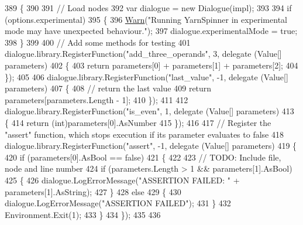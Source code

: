 \begin{DoxyCode}
389         \{
390 
391             \textcolor{comment}{// Load nodes}
392             var dialogue = \textcolor{keyword}{new} Dialogue(impl);
393 
394             \textcolor{keywordflow}{if} (options.experimental)
395             \{
396                 \hyperlink{a00197_a979bb6f049b6c5294f745a19e24ddd9d}{Warn}(\textcolor{stringliteral}{"Running YarnSpinner in experimental mode may have unexpected behaviour."});
397                 dialogue.experimentalMode = \textcolor{keyword}{true};
398             \}
399 
400             \textcolor{comment}{// Add some methods for testing}
401             dialogue.library.RegisterFunction(\textcolor{stringliteral}{"add\_three\_operands"}, 3, delegate (Value[] parameters)
402             \{
403                 \textcolor{keywordflow}{return} parameters[0] + parameters[1] + parameters[2];
404             \});
405 
406             dialogue.library.RegisterFunction(\textcolor{stringliteral}{"last\_value"}, -1, delegate (Value[] parameters)
407             \{
408                 \textcolor{comment}{// return the last value}
409                 \textcolor{keywordflow}{return} parameters[parameters.Length - 1];
410             \});
411 
412             dialogue.library.RegisterFunction(\textcolor{stringliteral}{"is\_even"}, 1, delegate (Value[] parameters)
413             \{
414                 \textcolor{keywordflow}{return} (\textcolor{keywordtype}{int})parameters[0].AsNumber %
415             \});
416 
417             \textcolor{comment}{// Register the "assert" function, which stops execution if its parameter evaluates to false}
418             dialogue.library.RegisterFunction(\textcolor{stringliteral}{"assert"}, -1, delegate (Value[] parameters)
419             \{
420                 \textcolor{keywordflow}{if} (parameters[0].AsBool == \textcolor{keyword}{false})
421                 \{
422 
423                     \textcolor{comment}{// TODO: Include file, node and line number}
424                     \textcolor{keywordflow}{if} (parameters.Length > 1 && parameters[1].AsBool)
425                     \{
426                         dialogue.LogErrorMessage(\textcolor{stringliteral}{"ASSERTION FAILED: "} + parameters[1].AsString);
427                     \}
428                     \textcolor{keywordflow}{else}
429                     \{
430                         dialogue.LogErrorMessage(\textcolor{stringliteral}{"ASSERTION FAILED"});
431                     \}
432                     Environment.Exit(1);
433                 \}
434             \});
435 
436 

\end{DoxyCode}
